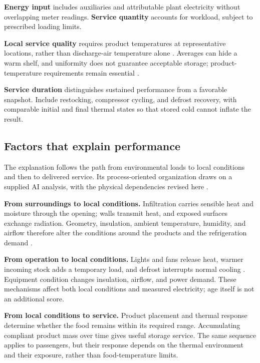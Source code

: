 \documentclass[12pt]{article}
\begin{document}
\noindent\textbf{Energy input} includes auxiliaries and attributable plant electricity without overlapping meter readings. \textbf{Service quantity} accounts for workload, subject to prescribed loading limits.

\textbf{Local service quality} requires product temperatures at representative locations, rather than discharge-air temperature alone \cite{ashrae}. Averages can hide a warm shelf, and uniformity does not guarantee acceptable storage; product-temperature requirements remain essential \cite{etl}.

\textbf{Service duration} distinguishes sustained performance from a favorable snapshot. Include restocking, compressor cycling, and defrost recovery, with comparable initial and final thermal states so that stored cold cannot inflate the result.


\subsection{Factors that explain performance}

The explanation follows the path from environmental loads to local conditions and then to delivered service. Its process-oriented organization draws on a supplied AI analysis, with the physical dependencies revised here \cite{gemini}.

\noindent\textbf{From surroundings to local conditions.} Infiltration carries sensible heat and moisture through the opening; walls transmit heat, and exposed surfaces exchange radiation. Geometry, insulation, ambient temperature, humidity, and airflow therefore alter the conditions around the products and the refrigeration demand \cite{ashrae}.

\noindent\textbf{From operation to local conditions.} Lights and fans release heat, warmer incoming stock adds a temporary load, and defrost interrupts normal cooling \cite{ashrae}. Equipment condition changes insulation, airflow, and power demand. These mechanisms affect both local conditions and measured electricity; age itself is not an additional score.

\noindent\textbf{From local conditions to service.} Product placement and thermal response determine whether the food remains within its required range. Accumulating compliant product mass over time gives useful storage service. The same sequence applies to passengers, but their response depends on the thermal environment and their exposure, rather than food-temperature limits.
\end{document}
